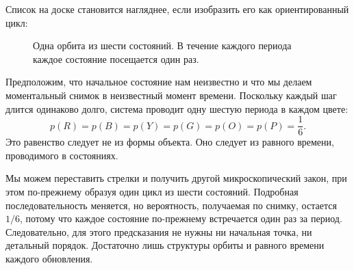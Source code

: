 Список на доске становится нагляднее, если изобразить его как ориентированный цикл:
\begin{figure}[htbp]
\centering
{}
\caption{Одна орбита из шести состояний. В течение каждого периода каждое состояние посещается один раз.}
\label{fig:sm1-six-cycle}
\end{figure}

Предположим, что начальное состояние нам неизвестно и что мы делаем моментальный снимок в неизвестный момент времени. Поскольку каждый шаг длится одинаково долго, система проводит одну шестую периода в каждом цвете:
\begin{equation}
 p(R)=p(B)=p(Y)=p(G)=p(O)=p(P)=\frac16.
 \label{eq:sm1-uniform-cycle}
\end{equation}
Это равенство следует не из формы объекта. Оно следует из равного времени, проводимого в состояниях.

Мы можем переставить стрелки и получить другой микроскопический закон, при этом по-прежнему образуя один цикл из шести состояний. Подробная последовательность меняется, но вероятность, получаемая по снимку, остается \(1/6\), потому что каждое состояние по-прежнему встречается один раз за период. Следовательно, для этого предсказания не нужны ни начальная точка, ни детальный порядок. Достаточно лишь структуры орбиты и равного времени каждого обновления.

\begin{classroomqa}
\end{classroomqa}


